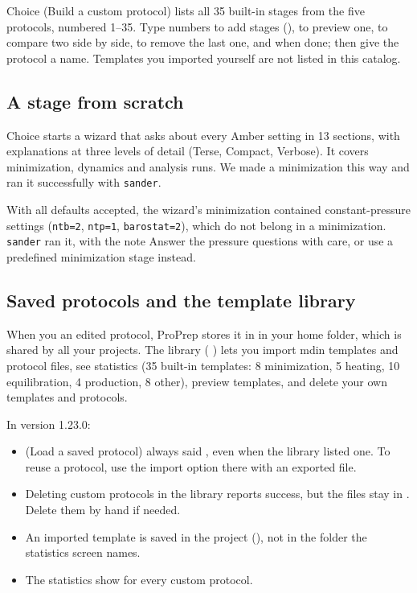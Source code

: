 Choice  (Build a custom protocol) lists all 35 built-in stages from
the five protocols, numbered 1--35. Type numbers to add stages (),
 to preview one,  to compare two side by side,
 to remove the last one, and  when done; then give the protocol
a name. Templates you imported yourself are not listed in this catalog.

\subsection{A stage from scratch}

Choice  starts a wizard that asks about every Amber setting in 13
sections, with explanations at three levels of detail (Terse, Compact,
Verbose). It covers minimization, dynamics and analysis runs. We made a
minimization this way and ran it successfully with \texttt{sander}.

\begin{watchout}
With all defaults accepted, the wizard's minimization contained
constant-pressure settings (\texttt{ntb=2}, \texttt{ntp=1},
\texttt{barostat=2}), which do not belong in a minimization. \texttt{sander}
ran it, with the note  Answer the pressure questions with care,
or use a predefined minimization stage instead.
\end{watchout}

\subsection{Saved protocols and the template library}

When you  an edited protocol, ProPrep stores it in
 in your home folder, which is
shared by all your projects. The library ( ) lets you import
mdin templates and protocol files, see statistics (35 built-in templates:
8 minimization, 5 heating, 10 equilibration, 4 production, 8 other), preview
templates, and delete your own templates and protocols.

\begin{watchout}
In version 1.23.0:
\begin{itemize}
  \item {} (Load a saved protocol) always said , even when the library listed one. To reuse a protocol, use the
        import option there with an exported  file.
  \item Deleting custom protocols in the library reports success, but the
        files stay in . Delete them
        by hand if needed.
  \item An imported  template is saved in the project
        (), not in the folder the statistics
        screen names.
  \item The statistics show  for every custom protocol.
\end{itemize}
\end{watchout}

